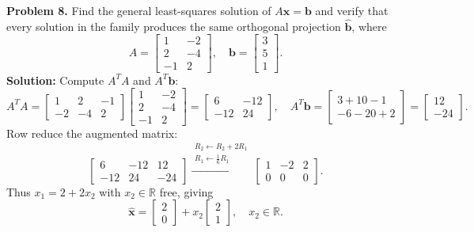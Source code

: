\documentclass[11pt, letterpaper]{article}
\theoremstyle{definition}
\theoremstyle{remark}
\begin{document}
\textbf{Problem 8.} Find the general least-squares solution of $A\mathbf{x} = \mathbf{b}$ and verify that every solution in the family produces the same orthogonal projection $\hat{\mathbf{b}}$, where
\[
A = \begin{bmatrix} 1 & -2 \\ 2 & -4 \\ -1 & 2 \end{bmatrix}, \quad \mathbf{b} = \begin{bmatrix} 3 \\ 5 \\ 1 \end{bmatrix}.
\]
\textbf{Solution:} Compute $A^T A$ and $A^T \mathbf{b}$:
\[
A^T A = \begin{bmatrix} 1 & 2 & -1 \\ -2 & -4 & 2 \end{bmatrix} \begin{bmatrix} 1 & -2 \\ 2 & -4 \\ -1 & 2 \end{bmatrix} = \begin{bmatrix} 6 & -12 \\ -12 & 24 \end{bmatrix}, \quad A^T \mathbf{b} = \begin{bmatrix} 3 + 10 - 1 \\ -6 - 20 + 2 \end{bmatrix} = \begin{bmatrix} 12 \\ -24 \end{bmatrix}.
\]
Row reduce the augmented matrix:
\[
\left[\begin{array}{cc|c} 6 & -12 & 12 \\ -12 & 24 & -24 \end{array}\right] \xrightarrow{\substack{R_2 \leftarrow R_2 + 2R_1 \\ R_1 \leftarrow \frac{1}{6}R_1}} \left[\begin{array}{cc|c} 1 & -2 & 2 \\ 0 & 0 & 0 \end{array}\right].
\]
Thus $x_1 = 2 + 2x_2$ with $x_2 \in \mathbb{R}$ free, giving
\[
\hat{\mathbf{x}} = \begin{bmatrix} 2 \\ 0 \end{bmatrix} + x_2 \begin{bmatrix} 2 \\ 1 \end{bmatrix}, \quad x_2 \in \mathbb{R}.
\]
\end{document}

